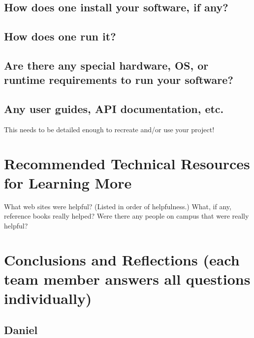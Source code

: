 \documentclass[journal,10pt,onecolumn,compsoc]{IEEEtran}
\begin{document}
    \subsection{How does one install your software, if any?}
    \subsection{How does one run it?}
    \subsection{Are there any special hardware, OS, or runtime requirements to run your software?}
    \subsection{Any user guides, API documentation, etc.}
    This needs to be detailed enough to recreate and/or use your project!
    \section{Recommended Technical Resources for Learning More}
    What web sites were helpful? (Listed in order of helpfulness.)
    What, if any, reference books really helped?
    Were there any people on campus that were really helpful?
    \section{Conclusions and Reflections (each team member answers all questions individually)}
    \subsection{Daniel}
\end{document}
